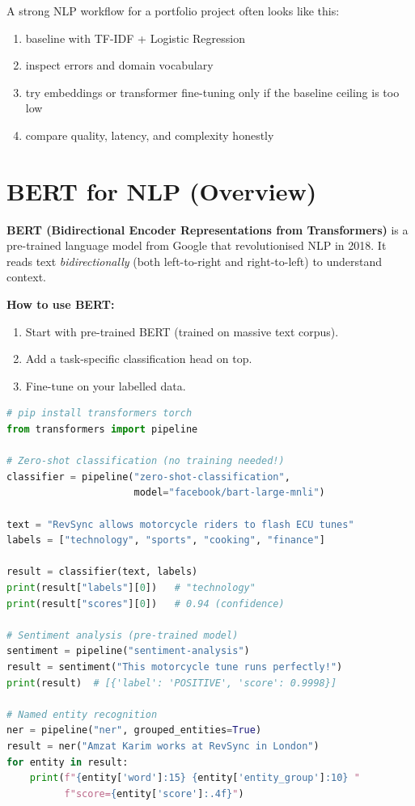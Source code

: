 \documentclass[12pt, a4paper, oneside]{book}
\begin{document}
\begin{projectbox}
A strong NLP workflow for a portfolio project often looks like this:
\begin{enumerate}[leftmargin=2em]
    \item baseline with TF-IDF + Logistic Regression
    \item inspect errors and domain vocabulary
    \item try embeddings or transformer fine-tuning only if the baseline ceiling is too low
    \item compare quality, latency, and complexity honestly
\end{enumerate}
\end{projectbox}

\section{BERT for NLP (Overview)}

\textbf{BERT (Bidirectional Encoder Representations from Transformers)} is a pre-trained language model from Google that revolutionised NLP in 2018. It reads text \emph{bidirectionally} (both left-to-right and right-to-left) to understand context.

\textbf{How to use BERT:}
\begin{enumerate}[leftmargin=2em]
    \item Start with pre-trained BERT (trained on massive text corpus).
    \item Add a task-specific classification head on top.
    \item Fine-tune on your labelled data.
\end{enumerate}

\begin{lstlisting}[language=Python, caption={BERT for text classification with Hugging Face}]
# pip install transformers torch
from transformers import pipeline

# Zero-shot classification (no training needed!)
classifier = pipeline("zero-shot-classification",
                      model="facebook/bart-large-mnli")

text = "RevSync allows motorcycle riders to flash ECU tunes"
labels = ["technology", "sports", "cooking", "finance"]

result = classifier(text, labels)
print(result["labels"][0])   # "technology"
print(result["scores"][0])   # 0.94 (confidence)

# Sentiment analysis (pre-trained model)
sentiment = pipeline("sentiment-analysis")
result = sentiment("This motorcycle tune runs perfectly!")
print(result)  # [{'label': 'POSITIVE', 'score': 0.9998}]

# Named entity recognition
ner = pipeline("ner", grouped_entities=True)
result = ner("Amzat Karim works at RevSync in London")
for entity in result:
    print(f"{entity['word']:15} {entity['entity_group']:10} "
          f"score={entity['score']:.4f}")
\end{lstlisting}
\end{document}
